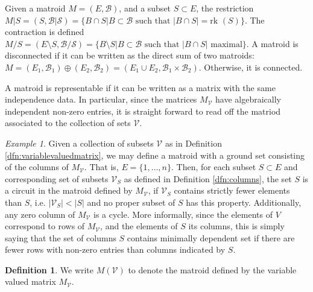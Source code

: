 \documentclass[11pt]{article}
\newcommand{\hlfix}[2]{\texthl{#1}\todo{#2}}
\newcommand{\rk}{\textrm{rk }}
\newcommand{\cV}{\mathcal{V}}
\theoremstyle{remark}
\newtheorem{eg}[thm]{Example}
\theoremstyle{definition}
\newtheorem{dfn}[thm]{Definition}
\begin{document}
Given a matroid $M = (E, \mathcal{B})$, and a subset $S \subset E$, the restriction $M|S = (S, \mathcal{B|S}) = \{B\cap S| B \subset \mathcal{B} \textrm{ such that } |B \cap S| = \rk(S) \}$. The contraction is defined $M/S = (E \setminus S, \mathcal{B/S}) = \{B\setminus S| B \subset \mathcal{B} \textrm{ such that } |B \cap S| \textrm{ maximal}\}$. A matroid is disconnected if it can be written as the direct sum of two matroids: $M = (E_1, \mathcal{B}_1) \oplus (E_2, \mathcal{B}_2)  = (E_1 \cup E_2 , \mathcal{B}_1 \times \mathcal{B}_2)$. Otherwise, it is connected.

A matroid is representable if it can be written as a matrix with the same independence data. In particular, since the matrices $M_\cV$ have algebraically independent non-zero entries, it is straight forward to read off the matriod associated to the collection of sets $\cV$.

\begin{eg}\label{eg:variablevaluesasmatroids}
Given a collection of subsets $\cV$ as in Definition \ref{dfn:variablevaluedmatrix}, we may define a matroid with a ground set consisting of the columns of $M_\cV$. That is, $E = \{1, \ldots , n\}$. Then, for each subset $S \subset E$ and corresponding set of subsets $\cV_S$ as defined in Definition \ref{dfn:columns}, the set $S$ is a circuit in the matroid defined by $M_\cV$, if $\cV_S$ contains strictly fewer elements than $S$, i.e. $|\cV_S| < |S|$ and no proper subset of $S$ has this property. Additionally, any zero column of $M_\cV$ is a cycle. More informally, since the elements of $V$ correspond to rows of $M_\cV$, and the elements of $S$ its columns, this is simply saying that the set of columns $S$ contains minimally dependent set if there are fewer rows with non-zero entries than columns indicated by $S$.  %
\end{eg}

\begin{dfn}\label{dfn:matroid}
We write $M(\cV)$ to denote the matroid defined by the variable valued matrix $M_\cV$. 
\end{dfn}
\end{document}
